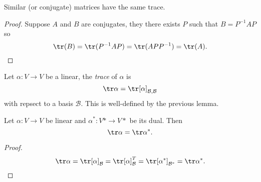 \documentclass[a4paper]{article}
\newcommand*{\basis}{\mathcal}
\theoremstyle{definition}
\begin{document}
\begin{lemma}
  Similar (or conjugate) matrices have the same trace.
\end{lemma}

\begin{proof}
  Suppose \(A\) and \(B\) are conjugates, they there exists \(P\) such that \(B = P^{-1}AP\) so
  \[
    \tr(B) = \tr(P^{-1}AP) = \tr(APP^{-1}) = \tr(A).
  \]
\end{proof}

\begin{definition}
  Let \(\alpha: V \to V\) be a linear, the \emph{trace} of \(\alpha\) is
  \[
    \tr \alpha = \tr [\alpha]_{\basis B, \basis B}
  \]
  with repsect to a basis \(\basis B\). This is well-defined by the previous lemma.
\end{definition}

\begin{lemma}
  Let \(\alpha: V \to V\) be linear and \(\alpha^*: V* \to V*\) be its dual. Then
  \[
    \tr \alpha = \tr \alpha^*.
  \]
\end{lemma}

\begin{proof}
  \[
    \tr \alpha = \tr [\alpha]_{\basis B} = \tr [\alpha]_{\basis B}^T = \tr[\alpha^*]_{\basis B^*} = \tr \alpha^*.
  \]
\end{proof}
\end{document}
